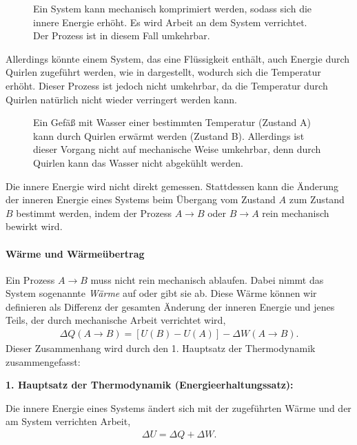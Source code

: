 \begin{figure}[htbp]
    \centering
    \tfigRectangularBoxWithPiston
    \caption{Ein System kann mechanisch komprimiert werden, sodass sich die innere Energie erhöht. Es wird Arbeit an dem System verrichtet. Der Prozess ist in diesem Fall umkehrbar. }
    \label{fig:RectangularBoxWithPiston}
\end{figure}

Allerdings könnte einem System, das eine Flüssigkeit enthält, auch Energie durch Quirlen zugeführt werden, wie in  dargestellt, wodurch sich die Temperatur erhöht. Dieser Prozess ist jedoch nicht umkehrbar, da die Temperatur durch Quirlen natürlich nicht wieder verringert werden kann.

\begin{figure}[htbp]
    \centering
    \tfigWaterStiringIceCubes
    \caption{Ein Gefäß mit Wasser einer bestimmten Temperatur (Zustand A) kann durch Quirlen erwärmt werden (Zustand B). Allerdings ist dieser Vorgang nicht auf mechanische Weise umkehrbar, denn durch Quirlen kann das Wasser nicht abgekühlt werden. }
    \label{fig:WaterStiringIceCubes}
\end{figure}

\begin{formal}
    Die innere Energie wird nicht direkt gemessen. Stattdessen kann die Änderung der inneren Energie eines Systems beim Übergang vom Zustand $A$ zum Zustand $B$ bestimmt werden, indem der Prozess $A\rightarrow B$ oder $B\rightarrow A$ rein mechanisch bewirkt wird.
\end{formal}



\paragraph*{Wärme und Wärmeübertrag}

Ein Prozess $A\rightarrow B$ muss nicht rein mechanisch ablaufen. Dabei nimmt das System sogenannte \emph{Wärme} auf oder gibt sie ab. Diese Wärme können wir definieren als Differenz der gesamten Änderung der inneren Energie und jenes Teils, der durch mechanische Arbeit verrichtet wird,
\begin{align*}
    \Delta Q(A\rightarrow B) = [U(B)-U(A)] - \Delta W(A\rightarrow B).
\end{align*}
Dieser Zusammenhang wird durch den 1. Hauptsatz der Thermodynamik zusammengefasst:
\begin{formal}
    \textbf{1. Hauptsatz der Thermodynamik (Energieerhaltungssatz):}

    Die innere Energie eines Systems ändert sich mit der zugeführten Wärme und der am System verrichten Arbeit,
    \begin{align*}
        \Delta U = \Delta Q + \Delta W.
    \end{align*}
\end{formal}

